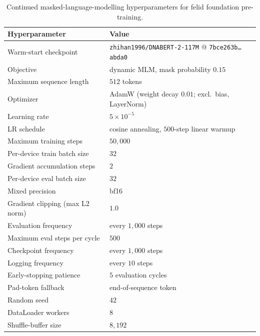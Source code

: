 \documentclass[twocolumn,10pt]{article}
\begin{document}
\begin{table}[t]
\centering
\caption{Continued masked-language-modelling hyperparameters for felid foundation pre-training.}
\label{tab:felid-pretrain-hparams}
\begin{tabular}{ll}
\toprule
Hyperparameter & Value \\
\midrule
Warm-start checkpoint & \texttt{zhihan1996/DNABERT-2-117M} @ \texttt{7bce263b\ldots abda0} \\
Objective & dynamic MLM, mask probability $0.15$ \\
Maximum sequence length & $512$ tokens \\
Optimizer & AdamW (weight decay $0.01$; excl.\ bias, LayerNorm) \\
Learning rate & $5\times10^{-5}$ \\
LR schedule & cosine annealing, $500$-step linear warmup \\
Maximum training steps & $50{,}000$ \\
Per-device train batch size & $32$ \\
Gradient accumulation steps & $2$ \\
Per-device eval batch size & $32$ \\
Mixed precision & bf16 \\
Gradient clipping (max L2 norm) & $1.0$ \\
Evaluation frequency & every $1{,}000$ steps \\
Maximum eval steps per cycle & $500$ \\
Checkpoint frequency & every $1{,}000$ steps \\
Logging frequency & every $10$ steps \\
Early-stopping patience & $5$ evaluation cycles \\
Pad-token fallback & end-of-sequence token \\
Random seed & $42$ \\
DataLoader workers & $8$ \\
Shuffle-buffer size & $8{,}192$ \\
\bottomrule
\end{tabular}
\end{table}
\end{document}
